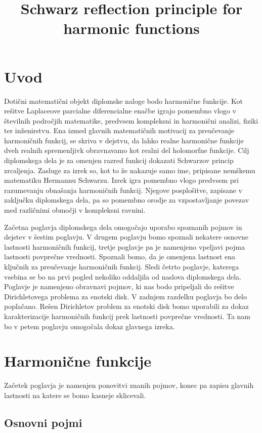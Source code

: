 \documentclass[mat1, tisk]{fmfdelo}
\title{Schwarz reflection principle for harmonic functions}
\begin{document}
\section{Uvod}

Dotični matematični objekt diplomske naloge bodo harmonične funkcije. 
Kot rešitve Laplaceove parcialne diferencialne enačbe igrajo pomembno vlogo v številnih področjih matematike, predvsem kompleksni in harmonični analizi, fiziki ter inženirstvu. 
Ena izmed glavnih matematičnih motivacij za preučevanje harmoničnih funkcij, se skriva v dejstvu, da lahko realne harmonične funkcije dveh realnih spremenljivk obravnavamo kot realni del holomorfne funkcije.
Cilj diplomskega dela je za omenjen razred funkcij dokazati Schwarzov princip zrcaljenja.
Zasluge za izrek so, kot to že nakazuje samo ime, pripisane nemškemu matematiku Hermannu Schwarzu.
Izrek igra pomembno vlogo predvsem pri razumevanju obnašanja harmoničnih funkcij. 
Njegove posplošitve, zapisane v zaključku diplomskega dela, pa so pomembno orodje za vzpostavljanje povezav med različnimi območji v kompleksni ravnini.

Začetna poglavja diplomskega dela omogočajo uporabo spoznanih pojmov in dejstev v šestim poglavju.
V drugem poglavju bomo spoznali nekatere osnovne lastnosti harmoničnih funkcij, tretje poglavje pa je namenjeno vpeljavi pojma lastnosti povprečne vrednosti. 
Spoznali bomo, da je omenjena lastnost ena ključnih za preučevanje harmoničnih funkcij. 
Sledi četrto poglavje, katerega vsebina se bo na prvi pogled nekoliko oddaljila od naslova diplomskega dela. 
Poglavje je namenjeno obravnavi pojmov, ki nas bodo pripeljali do rešitve Dirichletovega problema za enotski disk.
V zadnjem razdelku poglavja bo delo poplačano. Rešen Dirichletov problem za enotski disk bomo uporabili za dokaz karakterizacije harmoničnih funkcij prek lastnosti povprečne vrednosti.
Ta nam bo v petem poglavju omogočala dokaz glavnega izreka. 

\section{Harmonične funkcije}

Začetek poglavja je namenjen ponovitvi znanih pojmov, konec pa zapisu glavnih lastnosti na katere se bomo kasneje sklicevali. 

\subsection{Osnovni pojmi}
\end{document}
